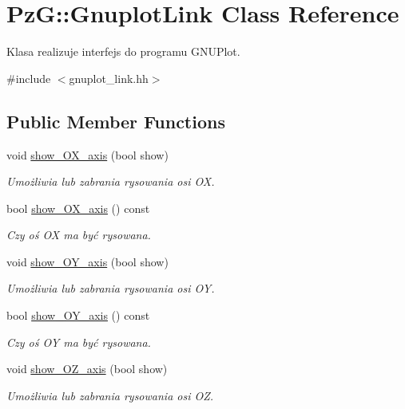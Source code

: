 \hypertarget{class_pz_g_1_1_gnuplot_link}{}\section{PzG\+:\+:Gnuplot\+Link Class Reference}
\label{class_pz_g_1_1_gnuplot_link}


Klasa realizuje interfejs do programu G\+N\+U\+Plot.  




{\ttfamily \#include $<$gnuplot\+\_\+link.\+hh$>$}

\subsection*{Public Member Functions}
\begin{DoxyCompactItemize}
\item 
void \hyperlink{class_pz_g_1_1_gnuplot_link_abd99d3a72eebe5c6323be5cf4a465b34}{show\+\_\+\+O\+X\+\_\+axis} (bool show)
\begin{DoxyCompactList}\small\item\em Umożliwia lub zabrania rysowania osi OX. \end{DoxyCompactList}\item 
bool \hyperlink{class_pz_g_1_1_gnuplot_link_a43c8b059bbfff0addbe7ab62760c242b}{show\+\_\+\+O\+X\+\_\+axis} () const
\begin{DoxyCompactList}\small\item\em Czy oś OX ma być rysowana. \end{DoxyCompactList}\item 
void \hyperlink{class_pz_g_1_1_gnuplot_link_a345cd5f032c34ffcc1e3aa16438dda82}{show\+\_\+\+O\+Y\+\_\+axis} (bool show)
\begin{DoxyCompactList}\small\item\em Umożliwia lub zabrania rysowania osi OY. \end{DoxyCompactList}\item 
bool \hyperlink{class_pz_g_1_1_gnuplot_link_a9b1c09293f8128fa970497d2effda7d3}{show\+\_\+\+O\+Y\+\_\+axis} () const
\begin{DoxyCompactList}\small\item\em Czy oś OY ma być rysowana. \end{DoxyCompactList}\item 
void \hyperlink{class_pz_g_1_1_gnuplot_link_ab4e8078f7c63779d5f4c21f22608d3ef}{show\+\_\+\+O\+Z\+\_\+axis} (bool show)
\begin{DoxyCompactList}\small\item\em Umożliwia lub zabrania rysowania osi OZ. \end{DoxyCompactList}\item 

\end{DoxyCompactItemize}
